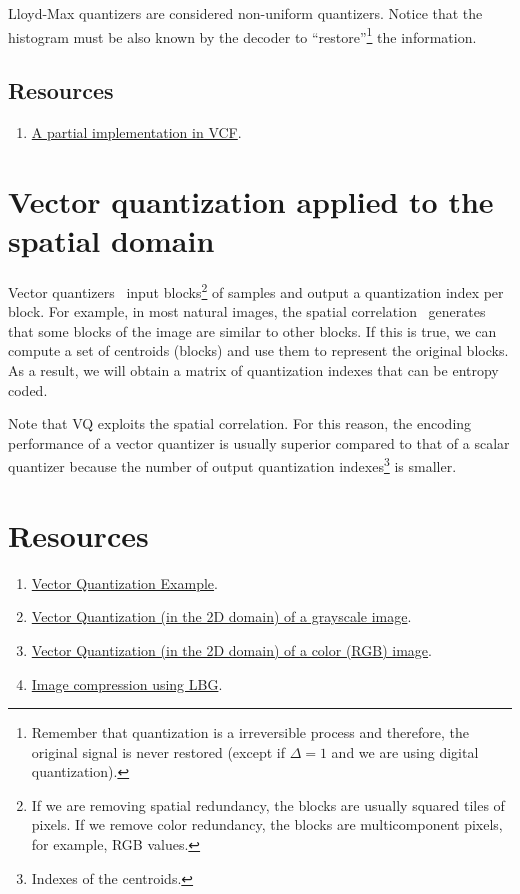 Lloyd-Max quantizers are considered non-uniform quantizers. Notice
that the histogram must be also known by the decoder to
``restore''\footnote{Remember that quantization is a irreversible
  process and therefore, the original signal is never restored (except
  if $\Delta=1$ and we are using digital quantization).} the
information.

\subsection*{Resources}

\begin{enumerate}
\item
  \href{https://github.com/Sistemas-Multimedia/VCF/blob/main/src/LloydMax.py}{A
    partial implementation in VCF}.
\end{enumerate}

\section{Vector quantization applied to the spatial domain}

Vector quantizers~\cite{vruiz__vector_quantization} input
blocks\footnote{If we are removing spatial redundancy, the blocks are
  usually squared tiles of pixels. If we remove color redundancy, the
  blocks are multicomponent pixels, for example, RGB values.} of
samples and output a quantization index per block. For example, in
most natural images, the spatial
correlation~\cite{vruiz__visual_redundancy} generates that some blocks
of the image are similar to other blocks. If this is true, we can
compute a set of centroids (blocks) and use them to represent the
original blocks. As a result, we will obtain a matrix of quantization
indexes that can be entropy coded.

Note that VQ exploits the spatial correlation. For this reason, the
encoding performance of a vector quantizer is usually superior
compared to that of a scalar quantizer because the number of output
quantization indexes\footnote{Indexes of the centroids.} is smaller.

\section*{Resources}

\begin{enumerate}
\item
  \href{https://scikit-learn.org/stable/auto_examples/cluster/plot_face_compress.html#sphx-glr-auto-examples-cluster-plot-face-compress-py}{Vector
    Quantization Example}.
\item
  \href{https://github.com/vicente-gonzalez-ruiz/vector_quantization/blob/main/docs/gray_VQ.ipynb}{Vector
    Quantization (in the 2D domain) of a grayscale image}.
\item
  \href{https://github.com/vicente-gonzalez-ruiz/vector_quantization/blob/main/docs/spatial_color_VQ.ipynb}{Vector
    Quantization (in the 2D domain) of a color (RGB) image}.
  
\item \href{https://github.com/droidadroit/LBG}{Image compression using LBG}.
\end{enumerate}

